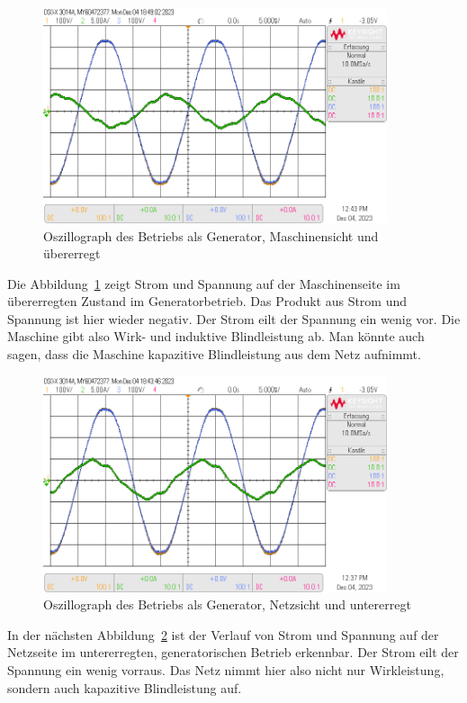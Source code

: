 \documentclass{report}
\begin{document}
\begin{figure}[!ht]
	\centering
	\includegraphics[width=0.9\textwidth]{./assets/img/synchronisation_maschine_generator_uee_vzp.png}
	\caption{Oszillograph des Betriebs als Generator, Maschinensicht und übererregt}
	\label{fig:smgue}
\end{figure}

Die Abbildung~\ref{fig:smgue} zeigt Strom und Spannung auf der Maschinenseite im übererregten Zustand im Generatorbetrieb. Das Produkt aus Strom und Spannung ist hier wieder negativ. Der Strom eilt der Spannung ein wenig vor. Die Maschine gibt also Wirk- und induktive Blindleistung ab. Man könnte auch sagen, dass die Maschine kapazitive Blindleistung aus dem Netz aufnimmt.

\begin{figure}[!ht]
	\centering
	\includegraphics[width=0.9\textwidth]{./assets/img/synchronisation_netz_generator_ue_vzp.png}
	\caption{Oszillograph des Betriebs als Generator, Netzsicht und untererregt}
	\label{fig:sngu}
\end{figure}

In der nächsten Abbildung~\ref{fig:sngu} ist der Verlauf von Strom und Spannung auf der Netzseite im untererregten, generatorischen Betrieb erkennbar. Der Strom eilt der Spannung ein wenig vorraus. Das Netz nimmt hier also nicht nur Wirkleistung, sondern auch kapazitive Blindleistung auf.
\end{document}
